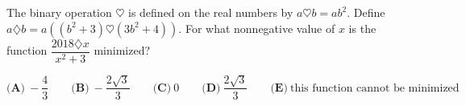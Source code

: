 The binary operation $\heartsuit$ is defined on the real numbers by $a\heartsuit b=ab^2$. Define $a\diamondsuit b=a\left((b^2+3)\heartsuit(3b^2+4)\right)$. For what nonnegative value of $x$ is the function $\dfrac{2018\diamondsuit x}{x^2+3}$ minimized?

$\textbf{(A)}\ -\dfrac{4}{3}\qquad\textbf{(B)}\ -\dfrac{2\sqrt3}{3}\qquad\textbf{(C)}\ 0\qquad\textbf{(D)}\ \dfrac{2\sqrt3}{3}\qquad\textbf{(E)}\ \text{this function cannot be minimized}$
